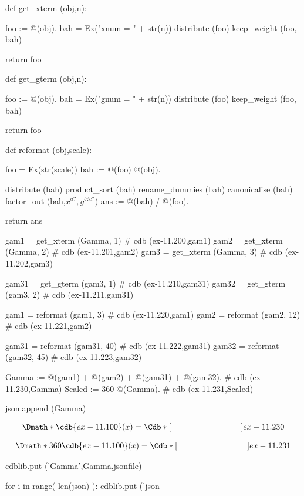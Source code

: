 \documentclass[12pt]{cdblatex}
\begin{document}
\begin{cadabra}
   def get_xterm (obj,n):

       foo := @(obj).
       bah  = Ex("xnum = " + str(n))
       distribute  (foo)
       keep_weight (foo, bah)

       return foo

   def get_gterm (obj,n):

       foo := @(obj).
       bah  = Ex("gnum = " + str(n))
       distribute  (foo)
       keep_weight (foo, bah)

       return foo

   def reformat (obj,scale):

      foo  = Ex(str(scale))
      bah := @(foo) @(obj).

      distribute     (bah)
      product_sort   (bah)
      rename_dummies (bah)
      canonicalise   (bah)
      factor_out     (bah,$x^{a?},g^{b? c?}$)
      ans := @(bah) / @(foo).

      return ans

   gam1  = get_xterm (Gamma, 1)                          # cdb (ex-11.200,gam1)
   gam2  = get_xterm (Gamma, 2)                          # cdb (ex-11.201,gam2)
   gam3  = get_xterm (Gamma, 3)                          # cdb (ex-11.202,gam3)

   gam31 = get_gterm (gam3,  1)                          # cdb (ex-11.210,gam31)
   gam32 = get_gterm (gam3,  2)                          # cdb (ex-11.211,gam31)

   gam1  = reformat (gam1,   3)                          # cdb (ex-11.220,gam1)
   gam2  = reformat (gam2,  12)                          # cdb (ex-11.221,gam2)

   gam31 = reformat (gam31, 40)                          # cdb (ex-11.222,gam31)
   gam32 = reformat (gam32, 45)                          # cdb (ex-11.223,gam32)

   Gamma  := @(gam1) + @(gam2) + @(gam31) + @(gam32).    # cdb (ex-11.230,Gamma)
   Scaled := 360 @(Gamma).                               # cdb (ex-11.231,Scaled)

   json.append (Gamma)

\end{cadabra}

\clearpage

\begin{dgroup*}
   \Dmath*{\cdb{ex-11.100}(x) = \Cdb*[\hskip 3.0cm]{ex-11.230}}
\end{dgroup*}

\begin{dgroup*}
   \Dmath*{360 \cdb{ex-11.100}(x) = \Cdb*[\hskip 3.0cm]{ex-11.231}}
\end{dgroup*}

\clearpage


\begin{cadabra}
   cdblib.put ('Gamma',Gamma,jsonfile)
\end{cadabra}

\bgroup
{}
\begin{cadabra}
   for i in range( len(json) ):
      cdblib.put ('json%
\end{cadabra}
\egroup
\end{document}
